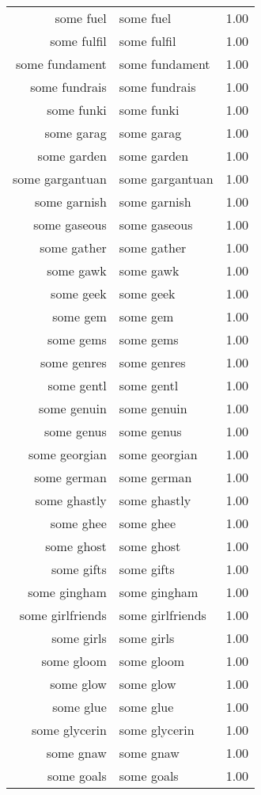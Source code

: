 \begin{table}[ht]
\begin{tabular}{rlr}
  some fuel & some fuel & 1.00 \\ 
  some fulfil & some fulfil & 1.00 \\ 
  some fundament & some fundament & 1.00 \\ 
  some fundrais & some fundrais & 1.00 \\ 
  some funki & some funki & 1.00 \\ 
  some garag & some garag & 1.00 \\ 
  some garden & some garden & 1.00 \\ 
  some gargantuan & some gargantuan & 1.00 \\ 
  some garnish & some garnish & 1.00 \\ 
  some gaseous & some gaseous & 1.00 \\ 
  some gather & some gather & 1.00 \\ 
  some gawk & some gawk & 1.00 \\ 
  some geek & some geek & 1.00 \\ 
  some gem & some gem & 1.00 \\ 
  some gems & some gems & 1.00 \\ 
  some genres & some genres & 1.00 \\ 
  some gentl & some gentl & 1.00 \\ 
  some genuin & some genuin & 1.00 \\ 
  some genus & some genus & 1.00 \\ 
  some georgian & some georgian & 1.00 \\ 
  some german & some german & 1.00 \\ 
  some ghastly & some ghastly & 1.00 \\ 
  some ghee & some ghee & 1.00 \\ 
  some ghost & some ghost & 1.00 \\ 
  some gifts & some gifts & 1.00 \\ 
  some gingham & some gingham & 1.00 \\ 
  some girlfriends & some girlfriends & 1.00 \\ 
  some girls & some girls & 1.00 \\ 
  some gloom & some gloom & 1.00 \\ 
  some glow & some glow & 1.00 \\ 
  some glue & some glue & 1.00 \\ 
  some glycerin & some glycerin & 1.00 \\ 
  some gnaw & some gnaw & 1.00 \\ 
  some goals & some goals & 1.00 \\ 

\end{tabular}
\end{table}
